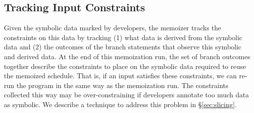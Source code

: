 





   
   
   
   











    



\subsection{Tracking Input Constraints} \label{sec:track-constraints}

Given the symbolic data marked by developers, the memoizer tracks the
constraints on this data by tracking (1) what data is derived from the
symbolic data and (2) the outcomes of the branch statements that observe this
symbolic and derived data.  At the end of this memoization run, the set of
branch outcomes together describe the constraints to place on the symbolic
data required to reuse the memoized schedule.  That is, if an input
satisfies these constraints, we can re-run the program in the same way as
the memoization run.  The constraints collected this way may be
over-constraining if developers annotate too much data as symbolic.  We
describe a technique to address this problem in \S\ref{sec:slicing}.


